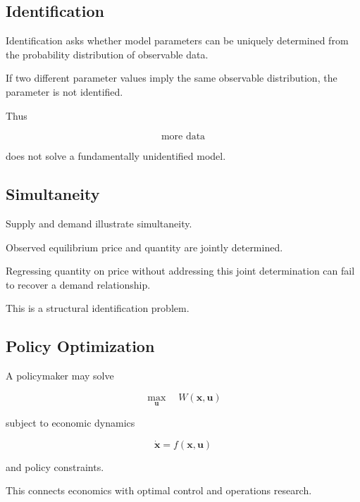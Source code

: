\subsection{Identification}
\label{subsec:economic-identification}

Identification asks whether model parameters can be uniquely determined from
the probability distribution of observable data.

If two different parameter values imply the same observable distribution,
the parameter is not identified.

Thus

\[
\boxed{
\text{more data}
}
\]

does not solve a fundamentally unidentified model.

\subsection{Simultaneity}
\label{subsec:economic-simultaneity}

Supply and demand illustrate simultaneity.

Observed equilibrium price and quantity are jointly determined.

Regressing quantity on price without addressing this joint determination can
fail to recover a demand relationship.

This is a structural identification problem.

\subsection{Policy Optimization}
\label{subsec:economic-policy-optimization}

A policymaker may solve

\[
\boxed{
\max_{\mathbf{u}}
\quad
W(\mathbf{x},\mathbf{u})
}
\]

subject to economic dynamics

\[
\boxed{
\dot{\mathbf{x}}
=
f(\mathbf{x},\mathbf{u})
}
\]

and policy constraints.

This connects economics with optimal control and operations research.

